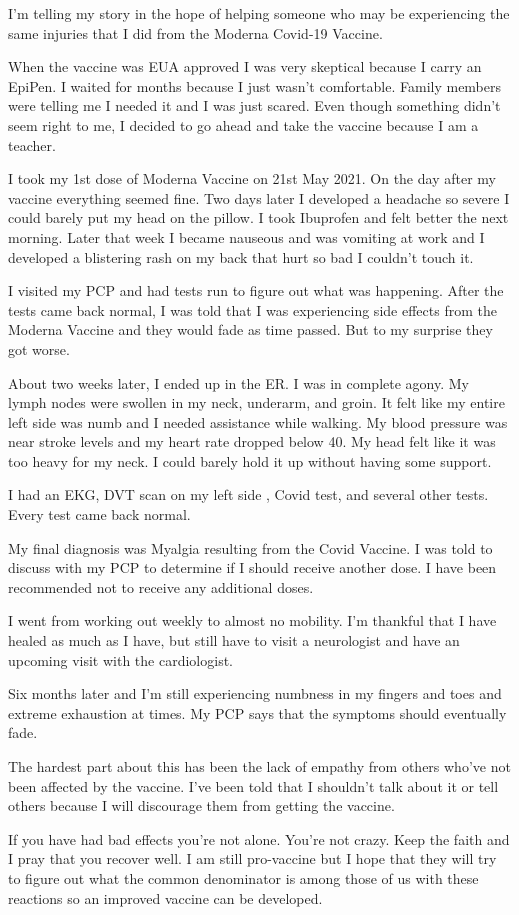 I’m telling my story in the hope of helping someone who may be experiencing the
same injuries that I did from the Moderna Covid-19 Vaccine.

When the vaccine was EUA approved I was very skeptical because I carry an
EpiPen. I waited for months because I just wasn’t comfortable. Family members
were telling me I needed it and I was just scared. Even though something didn’t
seem right to me, I decided to go ahead and take the vaccine because I am a
teacher.

I took my 1st dose of Moderna Vaccine on 21st May 2021. On the day after my
vaccine everything seemed fine. Two days later I developed a headache so severe
I could barely put my head on the pillow. I took Ibuprofen and felt better the
next morning. Later that week I became nauseous and was vomiting at work and I
developed a blistering rash on my back that hurt so bad I couldn’t touch it.

I visited my PCP and had tests run to figure out what was happening. After the
tests came back normal, I was told that I was experiencing side effects from the
Moderna Vaccine and they would fade as time passed. But to my surprise they got
worse.

About two weeks later, I ended up in the ER. I was in complete agony. My lymph
nodes were swollen in my neck, underarm, and groin. It felt like my entire left
side was numb and I needed assistance while walking. My blood pressure was near
stroke levels and my heart rate dropped below 40. My head felt like it was too
heavy for my neck. I could barely hold it up without having some support.

I had an EKG, DVT scan on my left side , Covid test, and several other
tests. Every test came back normal.

My final diagnosis was Myalgia resulting from the Covid Vaccine. I was told to
discuss with my PCP to determine if I should receive another dose. I have been
recommended not to receive any additional doses.

I went from working out weekly to almost no mobility. I’m thankful that I have
healed as much as I have, but still have to visit a neurologist and have an
upcoming visit with the cardiologist.

Six months later and I’m still experiencing numbness in my fingers and toes and
extreme exhaustion at times. My PCP says that the symptoms should eventually
fade.

The hardest part about this has been the lack of empathy from others who’ve not
been affected by the vaccine. I’ve been told that I shouldn’t talk about it or
tell others because I will discourage them from getting the vaccine.

If you have had bad effects you’re not alone. You’re not crazy. Keep the faith
and I pray that you recover well. I am still pro-vaccine but I hope that they
will try to figure out what the common denominator is among those of us with
these reactions so an improved vaccine can be developed.

